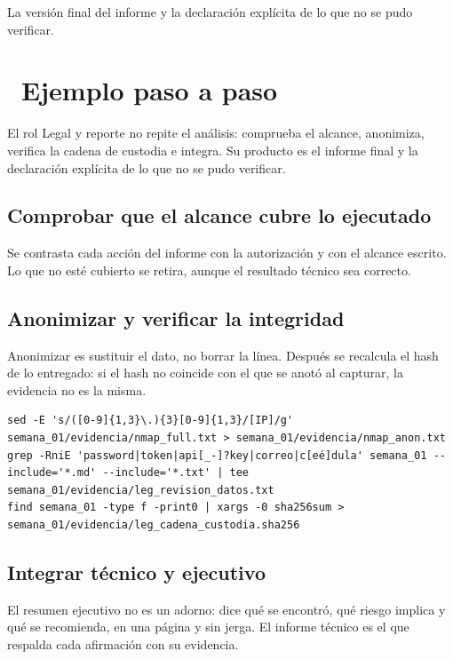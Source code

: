 \documentclass[11pt,a4paper]{article}
\newcommand{\iconotexto}[2]{\textcolor{cyanNeon}{\faIcon{#1}}~#2}
\begin{document}
La versión final del informe y la declaración explícita de lo que no se pudo verificar.

\section{\iconotexto{list-ol}{Ejemplo paso a paso}}

El rol Legal y reporte no repite el análisis: comprueba el alcance, anonimiza, verifica la cadena de custodia e integra. Su producto es el informe final y la declaración explícita de lo que no se pudo verificar.

\subsection{Comprobar que el alcance cubre lo ejecutado}

Se contrasta cada acción del informe con la autorización y con el alcance escrito. Lo que no esté cubierto se retira, aunque el resultado técnico sea correcto.

\subsection{Anonimizar y verificar la integridad}

Anonimizar es sustituir el dato, no borrar la línea. Después se recalcula el hash de lo entregado: si el hash no coincide con el que se anotó al capturar, la evidencia no es la misma.

\begin{lstlisting}[style=estiloCodigo]
sed -E 's/([0-9]{1,3}\.){3}[0-9]{1,3}/[IP]/g' semana_01/evidencia/nmap_full.txt > semana_01/evidencia/nmap_anon.txt
grep -RniE 'password|token|api[_-]?key|correo|c[eé]dula' semana_01 --include='*.md' --include='*.txt' | tee semana_01/evidencia/leg_revision_datos.txt
find semana_01 -type f -print0 | xargs -0 sha256sum > semana_01/evidencia/leg_cadena_custodia.sha256
\end{lstlisting}

\subsection{Integrar técnico y ejecutivo}

El resumen ejecutivo no es un adorno: dice qué se encontró, qué riesgo implica y qué se recomienda, en una página y sin jerga. El informe técnico es el que respalda cada afirmación con su evidencia.
\end{document}
